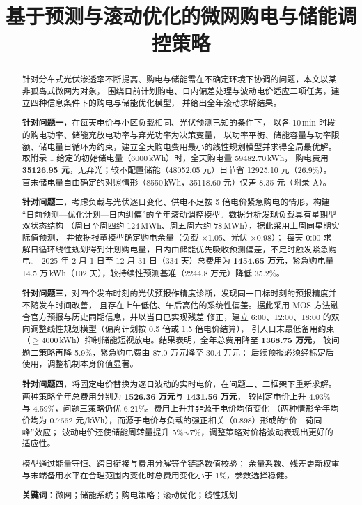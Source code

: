\documentclass{cumcmthesis}
\title{基于预测与滚动优化的微网购电与储能调控策略}
\begin{document}
\maketitle  %
\begin{abstract}
针对分布式光伏渗透率不断提高、购电与储能需在不确定环境下协调的问题，本文以某非孤岛式微网为对象，
围绕日前计划购电、日内偏差处理与波动电价适应三项任务，建立四种信息条件下的购电与储能优化模型，
并给出全年滚动求解结果。

\textbf{针对问题一}，在每天电价与小区负载相同、光伏预测已知的条件下，
以各 10\,min 时段的购电功率、储能充放电功率与弃光功率为决策变量，
以功率平衡、储能容量与功率限额、储电量日循环为约束，建立全天购电费用最小的线性规划模型并求得全局最优解。
取附录 1 给定的初始储电量（6000\,kWh）时，全天购电量 59482.70\,kWh，
购电费用 \textbf{35126.95 元}，无弃光；较不配置储能（48052.05 元）日节省 12925.10 元（26.9\%）。
首末储电量自由确定的对照情形（8550\,kWh，35118.60 元）仅差 8.35 元（附录 A）。

\textbf{针对问题二}，考虑负载与光伏逐日变化、供电不足按 5 倍电价紧急购电的情形，构建
“日前预测—优化计划—日内纠偏”的全年滚动调控模型。数据分析发现负载具有星期型双状态结构
（周日至周四约 124\,MWh、周五周六约 78\,MWh），据此采用上周同星期实际值预测，
并依据报童模型确定购电余量（负载 $\times$1.05、光伏 $\times$0.98）；
每天 0:00 求解日循环线性规划得到计划购电量，日内由储能优先吸收预测偏差，不足时触发紧急购电。
2025 年 2 月 1 日至 12 月 31 日（334 天）总费用为 \textbf{1454.65 万元}，紧急购电量 14.5 万\,kWh（102 天），较持续性预测基准（2244.8 万元）降低 35.2\%。

\textbf{针对问题三}，对四个发布时刻的光伏预报作精度诊断，发现同一目标时刻的预报精度并不随发布时间改善，
且存在上午低估、午后高估的系统性偏差。据此采用 MOS 方法融合官方预报与历史同期信息，并以当日已实现残差
修正，建立 6:00、12:00、18:00 的双向调整线性规划模型（偏离计划按 0.5 倍或 1.5 倍电价结算），
引入日末最低备用约束（$\ge$4000\,kWh）抑制储能短视放电。结果表明，全年总费用降至 \textbf{1368.75 万元}，
较问题二策略再降 5.9\%，紧急购电费由 87.0 万元降至 30.4 万元；
后续预报必须经标定后使用，调整机制本身价值显著。

\textbf{针对问题四}，将固定电价替换为逐日波动的实时电价，在问题二、三框架下重新求解。
两种策略全年总费用分别为 \textbf{1526.36 万元}与 \textbf{1431.56 万元}，
较固定电价上升 4.93\% 与 4.59\%，问题三策略仍优 6.21\%。费用上升并非源于电价均值变化
（两种情形全年均价均为 0.7662 元/kWh），而源于电价与负载的强正相关（0.898）形成的“价—荷同峰”效应；
波动电价还使储能周转量提升 5\%$\sim$7\%，调整策略对价格波动表现出更好的适应性。

模型通过能量守恒、跨日衔接与费用分解等全链路数值校验；
余量系数、残差更新权重与末端备用水平在合理范围内变化时总费用变化小于 1\%，参数选择稳健。

\textbf{关键词：}微网；储能系统；购电策略；滚动优化；线性规划

\end{abstract}
\end{document}
